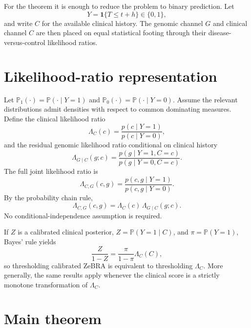 \documentclass[journal]{IEEEtran}
\newcommand{\Pone}{\mathbb{P}_1}
\newcommand{\Pzero}{\mathbb{P}_0}
\newcommand{\LR}{\Lambda}
\newcommand{\ind}{\mathbf{1}}
\begin{document}
For the theorem it is enough to reduce the problem to binary prediction. Let
\begin{equation}
Y=\ind\{T\le t+h\}\in\{0,1\},
\end{equation}
and write $C$ for the available clinical history. The genomic channel $G$ and clinical channel $C$ are then placed on equal statistical footing through their disease-versus-control likelihood ratios.

\section{Likelihood-ratio representation}

Let $\Pone(\cdot)=\mathbb{P}(\cdot\mid Y=1)$ and $\Pzero(\cdot)=\mathbb{P}(\cdot\mid Y=0)$. Assume the relevant distributions admit densities with respect to common dominating measures. Define the clinical likelihood ratio
\begin{equation}
\LR_C(c)=\frac{p(c\mid Y=1)}{p(c\mid Y=0)},
\label{eq:clinicalLR}
\end{equation}
and the residual genomic likelihood ratio conditional on clinical history
\begin{equation}
\LR_{G\mid C}(g;c)
=\frac{p(g\mid Y=1,C=c)}{p(g\mid Y=0,C=c)}.
\label{eq:conditionalGLR}
\end{equation}
The full joint likelihood ratio is
\begin{equation}
\LR_{C,G}(c,g)
=\frac{p(c,g\mid Y=1)}{p(c,g\mid Y=0)}.
\end{equation}
By the probability chain rule,
\begin{equation}
\boxed{
\LR_{C,G}(c,g)
=\LR_C(c)\,\LR_{G\mid C}(g;c).
}
\label{eq:factorization}
\end{equation}
No conditional-independence assumption is required.

If $Z$ is a calibrated clinical posterior, $Z=\mathbb{P}(Y=1\mid C)$, and $\pi=\mathbb{P}(Y=1)$, Bayes' rule yields
\begin{equation}
\frac{Z}{1-Z}
=\frac{\pi}{1-\pi}\LR_C(C),
\label{eq:zlr}
\end{equation}
so thresholding calibrated ZeBRA is equivalent to thresholding $\LR_C$. More generally, the same results apply whenever the clinical score is a strictly monotone transformation of $\LR_C$.

\section{Main theorem}
\end{document}
